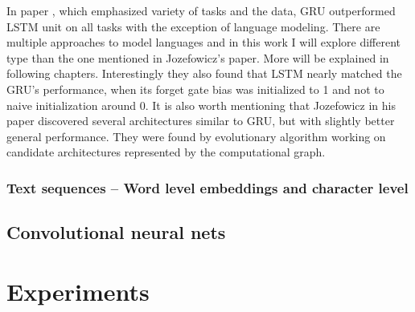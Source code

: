 In paper \cite{DBLP:conf/icml/JozefowiczZS15}, which emphasized variety of tasks and the data, GRU outperformed LSTM unit on all tasks with the exception of language modeling. There are multiple approaches to model languages and in this work I will explore different type than the one mentioned in Jozefowicz's \cite{DBLP:conf/icml/JozefowiczZS15} paper. More will be explained in following chapters. Interestingly they also found that LSTM nearly matched the GRU's performance, when its forget gate bias was initialized to 1 and not to naive initialization around 0.
It is also worth mentioning that Jozefowicz in his paper discovered several architectures similar to GRU, but with slightly better general performance. They were found by evolutionary algorithm working on candidate architectures  represented by the computational graph.


		\subsection{Text sequences -- Word level embeddings and character level}

	\section{Convolutional neural nets}

%

\chapter{Experiments}

